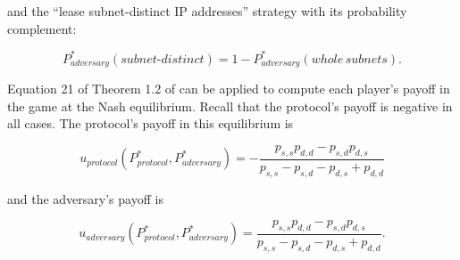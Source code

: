 \documentclass[english]{mrl}
\makeatletter
\theoremstyle{plain}
\newenvironment{proof}[1][\proofname]{\par
    \normalfont\topsep6\p@\@plus6\p@\relax
    \trivlist
    \itemindent\parindent
    \item[\hskip\labelsep
          \scshape
      #1]\ignorespaces
  }{%
    \endtrivlist\@endpefalse
  }
\providecommand{\proofname}{Proof}
\makeatother
\begin{document}
\begin{proof}
and the ``lease subnet-distinct IP addresses'' strategy with its
probability complement:

\begin{equation}
P_{adversary}^{*}(subnet\textrm{-}distinct)=1-P_{adversary}^{*}(whole\,subnets).
\end{equation}

Equation 21 of Theorem 1.2 of \cite{sun:hal-03852615}can be applied
to compute each player's payoff in the game at the Nash equilibrium.
Recall that the protocol's payoff is negative in all cases. The protocol's
payoff in this equilibrium is

\begin{equation}
u_{protocol}\left(P_{protocol}^{*},P_{adversary}^{*}\right)=-\dfrac{p_{s,s}p_{d,d}-p_{s,d}p_{d,s}}{p_{s,s}-p_{s,d}-p_{d,s}+p_{d,d}}
\end{equation}

and the adversary's payoff is

\begin{equation}
u_{adversary}\left(P_{protocol}^{*},P_{adversary}^{*}\right)=\dfrac{p_{s,s}p_{d,d}-p_{s,d}p_{d,s}}{p_{s,s}-p_{s,d}-p_{d,s}+p_{d,d}}.
\end{equation}
\end{proof}
\end{document}
